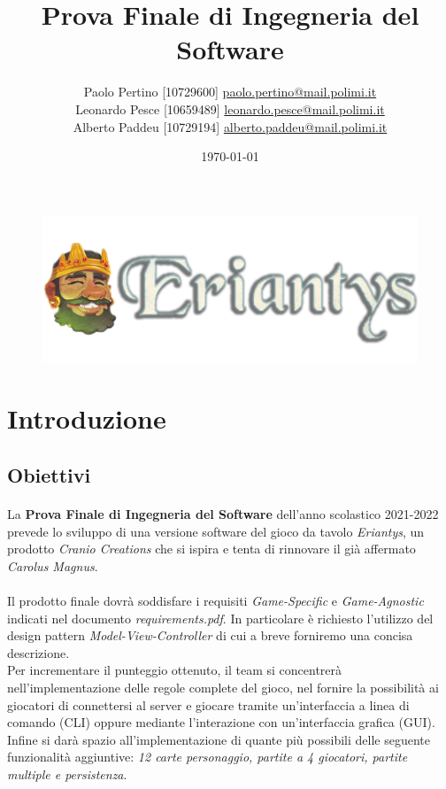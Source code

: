 \documentclass[a4paper, 12pt]{article}
\title{Prova Finale di Ingegneria del Software}
\author{
	Paolo Pertino [10729600]
	\href{mailto:paolo.pertino@mail.polimi.it}{paolo.pertino@mail.polimi.it} \\
	Leonardo Pesce [10659489]
	\href{mailto:leonardo.pesce@mail.polimi.it}{leonardo.pesce@mail.polimi.it} \\
	Alberto Paddeu [10729194]
	\href{mailto:alberto.paddeu@mail.polimi.it}{alberto.paddeu@mail.polimi.it} \\
}
\begin{document}
	\date{\today}
	\maketitle
	\begin{figure}[h!]
		\centering
		\includegraphics[scale=0.40]{launcherSplashBanner.png}
	\end{figure}
	\newpage
	
	\tableofcontents
	
	\newpage
	\section{Introduzione}
	\subsection{Obiettivi}
	\paragraph{}
	La \textbf{Prova Finale di Ingegneria del Software} dell'anno scolastico 2021-2022 prevede lo sviluppo di una versione software del gioco da tavolo \emph{Eriantys}, un prodotto \emph{Cranio Creations}\cite{eriantys} che si ispira e tenta di rinnovare il già affermato \emph{Carolus Magnus}\cite{carolusMagnus}.
	
	\paragraph{}
	Il prodotto finale dovrà soddisfare i requisiti \emph{Game-Specific} e \emph{Game-Agnostic} indicati nel documento \emph{requirements.pdf}. In particolare è richiesto l'utilizzo del design pattern \emph{Model-View-Controller} di cui a breve forniremo una concisa descrizione.\\
	Per incrementare il punteggio ottenuto, il team si concentrerà nell'implementazione delle regole complete del gioco, nel fornire la possibilità ai giocatori di connettersi al server e giocare tramite un'interfaccia a linea di comando (CLI) oppure mediante l'interazione con un'interfaccia grafica (GUI). Infine si darà spazio all'implementazione di quante più possibili delle seguente funzionalità aggiuntive: \emph{12 carte personaggio, partite a 4 giocatori, partite multiple e persistenza}.
	
\end{document}
